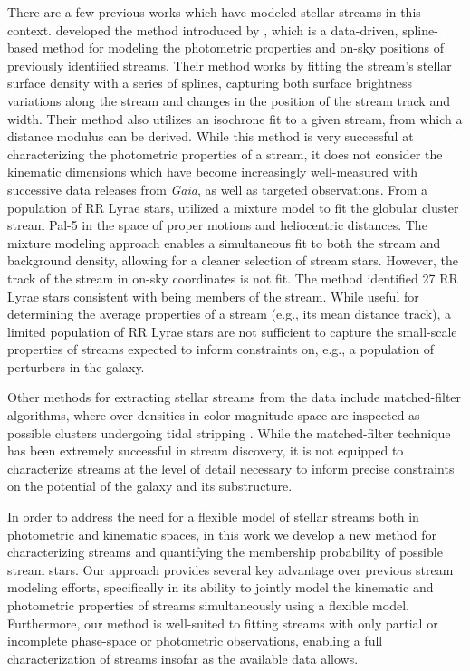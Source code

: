 \documentclass[twocolumn]{aastex631}
\newcommand{\dataarchive}[1]{\textit{#1}}
\newcommand{\Gaia}{\dataarchive{Gaia}}
\begin{document}
    There are a few previous works which have modeled stellar streams in this
    context. \citet{Patrick+2022} developed the method introduced by
    \citet{Erkal+2017}, which is a data-driven, spline-based method for modeling
    the photometric properties and on-sky positions of previously identified
    streams. Their method works by fitting the stream's stellar surface density
    with a series of splines, capturing both surface brightness variations along
    the stream and changes in the position of the stream track and width. Their
    method also utilizes an isochrone fit to a given stream, from which a
    distance modulus can be derived. While this method is very successful at
    characterizing the photometric properties of a stream, it does not consider
    the kinematic dimensions which have become increasingly well-measured with
    successive data releases from \Gaia{}, as well as targeted observations.
    From a population of RR Lyrae stars, \citet{Price-Whelan+2019} utilized a
    mixture model to fit the globular cluster stream Pal-5 in the space of
    proper motions and heliocentric distances.  The mixture modeling approach
    enables a simultaneous fit to both the stream and background density,
    allowing for a cleaner selection of stream stars. However, the track of the
    stream in on-sky coordinates is not fit. The method identified 27 RR Lyrae
    stars consistent with being members of the stream. While useful for
    determining the average properties of a stream (e.g., its mean distance
    track), a limited population of RR Lyrae stars are not sufficient to capture
    the small-scale properties of streams expected to inform constraints on,
    e.g., a population of perturbers in the galaxy.

    Other methods for extracting stellar streams from the data include
    matched-filter algorithms, where over-densities in color-magnitude space are
    inspected as possible clusters undergoing tidal stripping
    \citep{Grillmair+1995, GrillmairJohnson2006, Shipp+2018}.  While the
    matched-filter technique has been extremely successful in stream discovery,
    it is not equipped to characterize streams at the level of detail necessary
    to inform precise constraints on the potential of the galaxy and its
    substructure.

    In order to address the need for a flexible model of stellar streams both in
    photometric and kinematic spaces, in this work we develop a new method for
    characterizing streams and quantifying the membership probability of
    possible stream stars. Our approach provides several key advantage over
    previous stream modeling efforts, specifically in its ability to jointly
    model the kinematic and photometric properties of streams simultaneously
    using a flexible model.  Furthermore, our method is well-suited to fitting
    streams with only partial or incomplete phase-space or photometric
    observations, enabling a full characterization of streams insofar as the
    available data allows.
\end{document}

